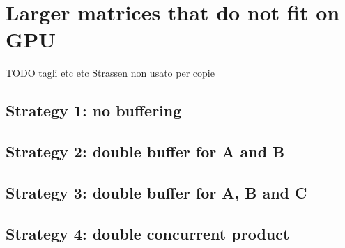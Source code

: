 \section{Larger matrices that do not fit on GPU}
TODO tagli etc etc Strassen non usato per copie
\subsection{Strategy 1: no buffering}
\subsection{Strategy 2: double buffer for A and B}
\subsection{Strategy 3: double buffer for A, B and C}
\subsection{Strategy 4: double concurrent product}
